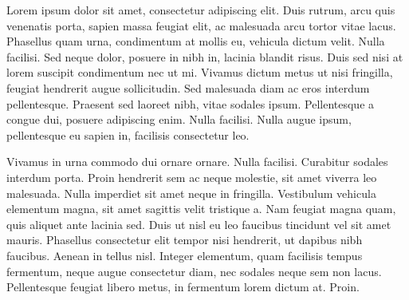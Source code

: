 
Lorem ipsum dolor sit amet, consectetur adipiscing elit. Duis rutrum,
arcu quis venenatis porta, sapien massa feugiat elit, ac malesuada
arcu tortor vitae lacus. Phasellus quam urna, condimentum at mollis
eu, vehicula dictum velit. Nulla facilisi. Sed neque dolor, posuere
in nibh in, lacinia blandit risus. Duis sed nisi at lorem suscipit
condimentum nec ut mi. Vivamus dictum metus ut nisi fringilla,
feugiat hendrerit augue sollicitudin. Sed malesuada diam ac eros
interdum pellentesque. Praesent sed laoreet nibh, vitae sodales
ipsum. Pellentesque a congue dui, posuere adipiscing enim. Nulla
facilisi. Nulla augue ipsum, pellentesque eu sapien in, facilisis
consectetur leo.

Vivamus in urna commodo dui ornare ornare. Nulla facilisi. Curabitur
sodales interdum porta. Proin hendrerit sem ac neque molestie, sit
amet viverra leo malesuada. Nulla imperdiet sit amet neque in
fringilla. Vestibulum vehicula elementum magna, sit amet sagittis
velit tristique a. Nam feugiat magna quam, quis aliquet ante lacinia
sed. Duis ut nisl eu leo faucibus tincidunt vel sit amet mauris.
Phasellus consectetur elit tempor nisi hendrerit, ut dapibus nibh
faucibus. Aenean in tellus nisl. Integer elementum, quam facilisis
tempus fermentum, neque augue consectetur diam, nec sodales neque sem
non lacus. Pellentesque feugiat libero metus, in fermentum lorem
dictum at. Proin.
